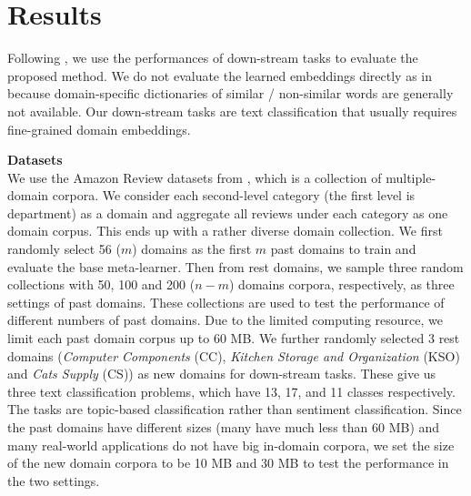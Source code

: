 \section{Results}
\label{chap3:sec:exp}
Following \cite{nayak2016evaluating},
we use the performances of down-stream tasks to evaluate the proposed method. 
We do not evaluate the learned embeddings directly as in \cite{mikolov2013distributed,pennington2014glove} because domain-specific dictionaries of similar / non-similar words are generally not available. Our down-stream tasks are text classification that usually requires fine-grained domain embeddings.

\textbf{Datasets}\\
We use the Amazon Review datasets from \cite{HeMcA16a}, which is a collection of multiple-domain corpora. We consider each second-level category (the first level is department) as a domain and aggregate all reviews under each category as one domain corpus. This ends up with a rather diverse domain collection. 
We first randomly select 56 ($m$) domains as the first $m$ past domains to train and evaluate the base meta-learner.
Then from rest domains, we sample three random collections with 50, 100 and 200 ($n-m$) domains corpora, respectively, as three settings of past domains.
These collections are used to test the performance of different numbers of past domains.
Due to the limited computing resource, we limit each past domain corpus up to 60 MB.
We further randomly selected 3 rest domains (\emph{Computer Components} (CC), \emph{Kitchen Storage and Organization} (KSO) and \emph{Cats Supply} (CS)) as new domains for down-stream tasks. These give us three text classification problems, which have 13, 17, and 11 classes respectively. The tasks are topic-based classification rather than sentiment classification. 
Since the past domains have different sizes (many have much less than 60 MB) and many real-world applications do not have big in-domain corpora, we set the size of the new domain corpora to be 10 MB and 30 MB to test the performance in the two settings.

